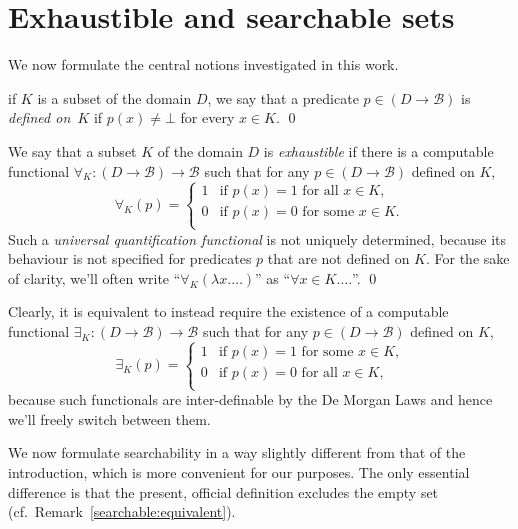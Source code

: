 \documentclass{LMCS}
\newcommand{\licsmath}[1]{\[ #1 \]}
\newcommand{\pBool}{\mathcal{B}}
\newcommand{\True}{1}\newcommand{\False}{0}\newcommand{\domain}[1]{{\D_{#1}}}
\newcommand{\D}{D}
\begin{document}
\section{Exhaustible and searchable sets} \label{definitions}

We now formulate the central notions investigated in this work.
\begin{defi} \label{definedon} if $K$ is a subset of the domain
  $\D$, we say that a predicate $p \in (\D \to \pBool)$ is
  \emph{defined on~$K$} if $p(x) \ne \bot$
  for every $x \in K$. \qed
\end{defi}

\begin{defi} \label{exhaustible:def} We say that a subset $K$ of
  the domain $D$ is \emph{exhaustible} if there is a computable
  functional $\forall_K \colon (\D \to \pBool) \to \pBool$ such that
  for any $p \in (\D \to \pBool)$ defined on $K$,
\licsmath{
  \forall_K(p)=
  \begin{cases}
    \True & \text{if $p(x)=\True$ for all $x \in K$,} \\
    \False & \text{if $p(x)=\False$ for some $x \in K$.} \\
  \end{cases}
  }
Such a \emph{universal quantification functional} is not uniquely
  determined, because its behaviour is not specified for predicates
  $p$ that are not defined on $K$. For the sake of clarity, we'll
  often write ``$\forall_K(\lambda x.  \dots)$'' as ``$\forall x \in
  K. \dots$''.  \qed
\end{defi}
Clearly, it is equivalent to instead require the existence of a
computable functional $\exists_K \colon (\D \to \pBool) \to \pBool$
such that for any $p \in (\D \to \pBool)$ defined on $K$,
\licsmath{
\exists_K(p)=
\begin{cases}
  \True & \text{if $p(x)=\True$ for some $x \in K$,} \\
  \False & \text{if $p(x)=\False$ for all $x \in K$,} \\
\end{cases}
} 
because such functionals are inter-definable by the De Morgan Laws
and hence we'll freely switch between them.

We now formulate searchability in a way slightly different from that
of the introduction, which is more convenient for our purposes. The
only essential difference is that the present, official definition
excludes the empty set (cf.\ Remark~\ref{searchable:equivalent}).
\end{document}
